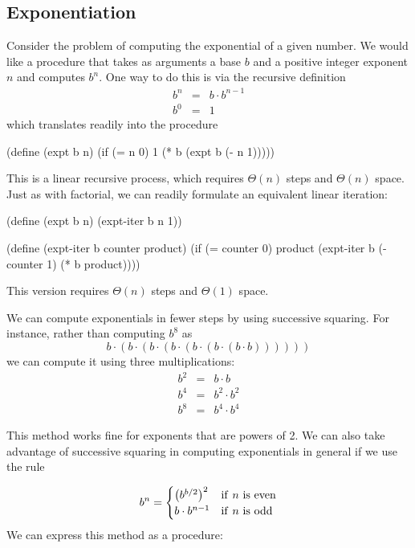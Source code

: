 \subsection{Exponentiation}
\label{sec:1.2.4}

Consider the problem of computing the exponential of a given number.
We would like a procedure that takes as arguments a base $b$ and a
positive integer exponent $n$ and computes $b^n$.  One way to do this
is via the recursive definition
\begin{eqnarray*}
b^n & = & b \cdot b^{n-1} \\
b^0 & = & 1 
\end{eqnarray*}
which translates readily into the procedure 

\begin{schemedisplay}
(define (expt b n)
  (if (= n 0)
      1
      (* b (expt b (- n 1)))))
\end{schemedisplay}
This is a linear recursive process, which requires $\Theta(n)$ steps
and $\Theta(n)$ space.  Just as with factorial, we can readily
formulate an equivalent linear iteration:

\begin{schemedisplay}
(define (expt b n)
  (expt-iter b n 1))

(define (expt-iter b counter product)
  (if (= counter 0)
      product
      (expt-iter b
                (- counter 1)
                (* b product)))) 
\end{schemedisplay}
This version requires $\Theta(n)$ steps and $\Theta(1)$ space.

We can compute exponentials in fewer steps by using successive
squaring.  For instance, rather than computing $b^8$ as
$$b \cdot (b \cdot (b \cdot (b \cdot (b \cdot (b \cdot (b \cdot b))))))$$
we can compute it using three multiplications:
\begin{eqnarray*}
b^2 & = & b \cdot b \\
b^4 & = & b^2 \cdot b^2 \\
b^8 & = & b^4 \cdot b^4 
\end{eqnarray*}

This method works fine for exponents that are powers of 2.  We can
also take advantage of successive squaring in computing exponentials
in general if we use the rule

\begin{displaymath}
  b^n =
  \begin{cases}
    \big(b^{b/2}\big)^2 & {\rm if~} n {\rm ~is~even} \\
    b \cdot b^{n-1} & {\rm if~} n {\rm ~is~odd}
  \end{cases}
\end{displaymath}
We can express this method as a procedure:


